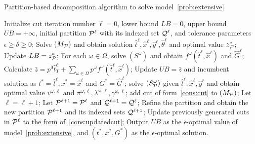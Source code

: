 \documentclass[11pt]{article}
\newcommand{\cQ}{{\cal Q}}
\newcommand{\cP}{{\cal P}}
\newcommand{\tcr}{\textcolor{red}}
\begin{document}
	\begin{algorithm}[ht]
		\caption{Partition-based decomposition algorithm to solve model~\eqref{prob:extensive}}
		\label{alg:Cut}
		\begin{algorithmic}[1]
			\State Initialize cut iteration number \(\ell = 0\), lower bound \(LB = 0\), upper bound \(UB = +\infty\), initial partition \(\cP^\ell\) with its indexed set \(\cQ^\ell\), and tolerance parameters \( \epsilon \ge \delta \ge 0\);
			 \label{alg:while_step}
			\State Solve \((M_{\cP})\) and obtain solution \(\hat{t}^{\ell}, \hat{x}^{\ell}, \hat{y}^{\ell}, \hat{\theta}^{\ell}\) and optimal value \(z_{\cP}^*\);
			\If{\(z_{\cP}^* > LB\)}
			\State Update \(LB = z_{\cP}^*\);
			\EndIf
			\State For each \(\omega \in \Omega\), solve \((S^\omega)\) and obtain \(f^{\omega}(\hat{t}^{\ell},\hat{x}^{\ell})\) and \(\hat{G}^\ell\); 
			\State Calculate \(\bar{z} = p^0 \hat{t}^\ell_T + \sum_{\omega \in \Omega} p^\omega f^{\omega}(\hat{t}^\ell,\hat{x}^\ell)\); \label{alg:upper_bound_calculation} 
			\State Update \(UB =\bar{z}\) and incumbent solution as \(t^* = \hat{t}^\ell, x^* = \hat{x}^\ell\) and \(G^* = \hat{G}^\ell\);
			\EndIf
			\State solve \((S_{\cP}^\omega)\) given \(\hat{t}^{\ell}, \hat{x}^{\ell}, \hat{y}^{\ell}\) and obtain optimal value \(v^{\omega,\ell}\) and \(\pi^{\omega,\ell}, \lambda^{\omega,\ell}, \gamma^{\omega,\ell}\); \label{alg:step_to_solve_LP_sub}
			add cut of form~\eqref{cons:cut} to \((M_{\cP})\);
			\EndIf
			\EndFor
			\State Let \(\ell = \ell + 1\);
			\State Let \(\cP^{\ell + 1} = \cP^\ell\) and \(\cQ^{\ell + 1} = \cQ^\ell\); 
			\Else
			\State Refine the partition and obtain the new partition \(\cP^{\ell + 1}\) and its indexed sets \(\cQ^{\ell + 1}\); \label{alg:refine_partition}
			\State Update previously generated cuts in \(\cP^\ell\) to the form of~\eqref{cons:updatedcut};
			\EndIf
			\vspace{0.1cm}
			\State Output \(UB\) as the $\epsilon$-optimal value of model~\eqref{prob:extensive}, and \((t^*, x^*, G^*)\) as the $\epsilon$-optimal solution.
		\end{algorithmic}
	\end{algorithm}
\end{document}
